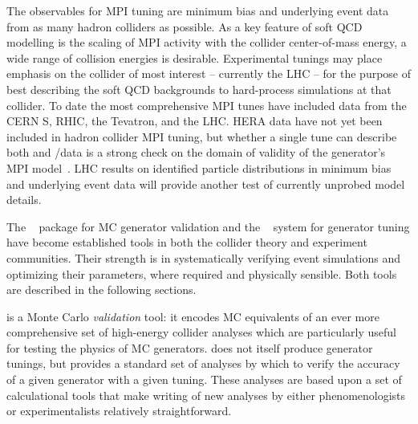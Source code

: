 \begin{itemize}
  The observables for MPI tuning are minimum bias and underlying event data from
  as many hadron colliders as possible. As a key feature of soft QCD modelling
  is the scaling of MPI activity with the collider center-of-mass energy, a wide
  range of collision energies is desirable. Experimental tunings may place
  emphasis on the collider of most interest -- currently the LHC -- for the
  purpose of best describing the soft QCD backgrounds to hard-process simulations
  at that collider. To date the most comprehensive MPI tunes have included data
  from the CERN S, RHIC, the Tevatron, and the LHC. HERA data have not yet
  been included in hadron collider MPI tuning, but whether a single tune can
  describe both \ep and \pp/\ppbar data is a strong check on the domain of validity of
  the generator's MPI model~\cite{Carli:2010jb}. LHC results on identified
  particle distributions in minimum bias and underlying event data will provide
  another test of currently unprobed model details.
\end{itemize}


The \rivet~\cite{Buckley:2010ar} package for MC generator validation and the
\professor~\cite{Buckley:2009bj} system for generator tuning have become
established tools in both the collider theory and experiment communities. Their
strength is in systematically verifying event simulations and optimizing their
parameters, where required and physically sensible. Both tools are
described in the following sections.


\mcsubsection{\rivet}
\label{sec:rivet}

\rivet is a Monte Carlo \emph{validation} tool: it encodes MC equivalents of an ever
more comprehensive set of high-energy collider analyses which are particularly useful
for testing the physics of MC generators. \rivet does not itself produce
generator tunings, but provides a standard set of analyses by which to verify
the accuracy of a given generator with a given tuning. These analyses are based
upon a set of calculational tools that make writing of new analyses by either
phenomenologists or experimentalists relatively straightforward.

